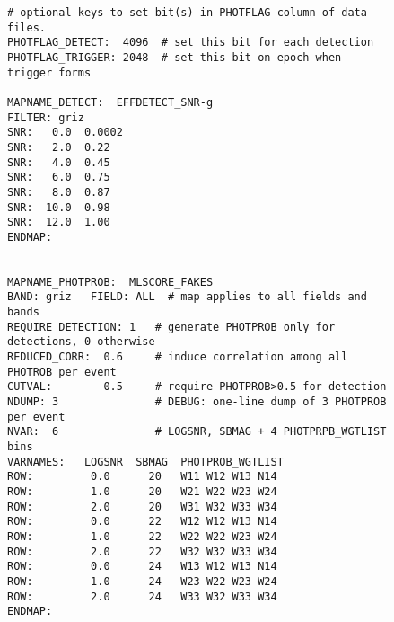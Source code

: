 \documentclass[12pt]{article}
\begin{document}
{\begin{figure}[hb]
\begin{center}
\begin{Verbatim}[frame=single]
# optional keys to set bit(s) in PHOTFLAG column of data files.
PHOTFLAG_DETECT:  4096  # set this bit for each detection
PHOTFLAG_TRIGGER: 2048  # set this bit on epoch when trigger forms

MAPNAME_DETECT:  EFFDETECT_SNR-g
FILTER: griz
SNR:   0.0  0.0002
SNR:   2.0  0.22
SNR:   4.0  0.45
SNR:   6.0  0.75
SNR:   8.0  0.87
SNR:  10.0  0.98
SNR:  12.0  1.00
ENDMAP:


MAPNAME_PHOTPROB:  MLSCORE_FAKES
BAND: griz   FIELD: ALL  # map applies to all fields and bands
REQUIRE_DETECTION: 1   # generate PHOTPROB only for detections, 0 otherwise
REDUCED_CORR:  0.6     # induce correlation among all PHOTROB per event
CUTVAL:        0.5     # require PHOTPROB>0.5 for detection
NDUMP: 3               # DEBUG: one-line dump of 3 PHOTPROB per event
NVAR:  6               # LOGSNR, SBMAG + 4 PHOTPRPB_WGTLIST bins
VARNAMES:   LOGSNR  SBMAG  PHOTPROB_WGTLIST
ROW:         0.0      20   W11 W12 W13 N14
ROW:         1.0      20   W21 W22 W23 W24
ROW:         2.0      20   W31 W32 W33 W34
ROW:         0.0      22   W12 W12 W13 N14
ROW:         1.0      22   W22 W22 W23 W24
ROW:         2.0      22   W32 W32 W33 W34
ROW:         0.0      24   W13 W12 W13 N14
ROW:         1.0      24   W23 W22 W23 W24
ROW:         2.0      24   W33 W32 W33 W34
ENDMAP:
\end{Verbatim} 
\end{center} 
\end{figure}

}
\end{document}
